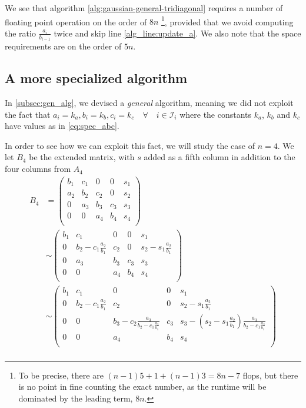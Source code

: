 \documentclass[a4paper]{article}
\begin{document}
We see that algorithm \ref{alg:gaussian-general-tridiagonal} requires a number of floating point operation on the order of $8n$ \footnote{To be precise, there are $(n-1)5 + 1 + (n-1)3 = 8n-7$ flops, but there is no point in fine counting the exact number, as the runtime will be dominated by the leading term, $8n$.}, provided that we avoid computing the ratio $\frac{a_i}{b_{i-1}}$ twice and skip line \ref{alg_line:update_a}.
We also note that the space requirements are on the order of $5n$.

\subsection{A more specialized algorithm}
In \ref{subsec:gen_alg}, we devised a \emph{general} algorithm, meaning we did not exploit the fact that $a_i=k_a, b_i=k_b, c_i=k_c \quad \forall \quad i \in \mathcal{I}_i$ where the constants $k_a$, $k_b$ and $k_c$ have values as in  \eqref{eq:spec_abc}.

In order to see how we can exploit this fact, we will study the case of $n=4$. We let $B_4$ be the extended matrix, with $s$ added as a fifth column in addition to the four columns from $A_4$
\begin{align}
B_4 &= \left(\begin{array}{ccccc}
              b_1 & c_1 & 0   & 0   & s_1 \\
              a_2 & b_2 & c_2 & 0   & s_2 \\
              0   & a_3 & b_3 & c_3 & s_3 \\
              0   &   0 & a_4 & b_4 & s_4 \\
         \end{array} \right)\\
&\sim
 \left(\begin{array}{ccccc}
      b_1 & c_1 & 0   & 0   & s_1 \\
      0   & b_2 - c_1\frac{a_2}{b_1} & c_2 & 0   & s_2 - s_1\frac{a_2}{b_1} \\
      0   & a_3 & b_3 & c_3 & s_3 \\
      0   &   0 & a_4 & b_4 & s_4 \\
 \end{array} \right) \\
&\sim
 \left(\begin{array}{ccccc}
       b_1 & c_1 & 0   & 0   & s_1 \\
       0   & b_2 - c_1\frac{a_2}{b_1} & c_2 & 0   & s_2 - s_1\frac{a_2}{b_1} \\
       0   & 0 & b_3 - c_2\frac{a_3}{b_2 - c_1\frac{a_2}{b_1}} & c_3 & s_3 - (s_2 - s_1\frac{a_2}{b_1})\frac{a_3}{b_2 - c_1\frac{a_2}{b_1}} \\
       0   &   0 & a_4 & b_4 & s_4 \\
  \end{array} \right) \\
\end{align}
\end{document}
